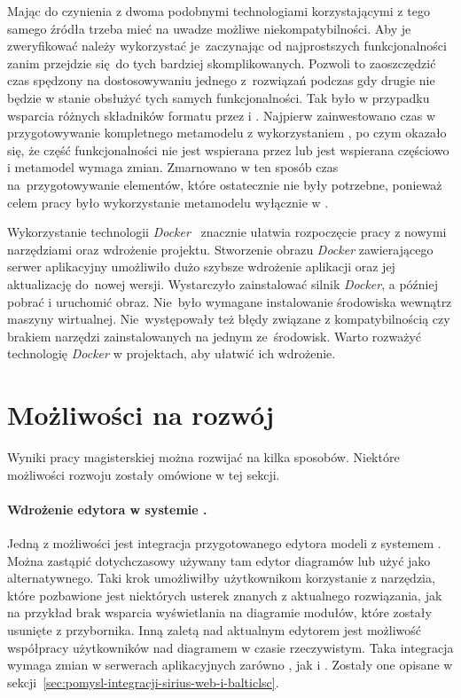 Mając do czynienia z dwoma podobnymi technologiami korzystającymi z tego samego
źródła trzeba mieć na uwadze możliwe niekompatybilności. Aby je zweryfikować
należy wykorzystać je~zaczynając od najprostszych funkcjonalności zanim
przejdzie się do tych
bardziej skomplikowanych. Pozwoli to zaoszczędzić czas spędzony na
dostosowywaniu jednego z~rozwiązań podczas gdy drugie nie będzie w stanie
obsłużyć tych samych funkcjonalności. Tak było w przypadku wsparcia różnych
składników formatu \Ecore{} przez \SiriusDesktop{} i \SiriusWeb{}. Najpierw
zainwestowano czas w przygotowywanie kompletnego
metamodelu z
wykorzystaniem \SiriusDesktop{}, po czym okazało się, że część
funkcjonalności nie jest wspierana przez \SiriusWeb{} lub jest wspierana
częściowo i metamodel wymaga zmian. Zmarnowano w ten sposób czas
na~przygotowywanie elementów, które ostatecznie nie były potrzebne, ponieważ
celem
pracy było wykorzystanie metamodelu wyłącznie w \SiriusWeb{}.

Wykorzystanie technologii \emph{Docker}~\cite{wikipedia-docker} znacznie
ułatwia rozpoczęcie pracy z
nowymi narzędziami oraz wdrożenie projektu.
Stworzenie obrazu \emph{Docker} zawierającego serwer aplikacyjny \SiriusWeb{}
umożliwiło dużo szybsze wdrożenie aplikacji oraz jej aktualizację
do~nowej wersji. Wystarczyło zainstalować silnik \emph{Docker}, a później
pobrać i uruchomić obraz. Nie~było wymagane instalowanie środowiska \Java{}
wewnątrz maszyny wirtualnej. Nie~występowały też błędy związane z
kompatybilnością czy brakiem narzędzi zainstalowanych na jednym ze~środowisk.
Warto rozważyć technologię \emph{Docker} w projektach, aby ułatwić ich
wdrożenie.

\section{Możliwości na rozwój}

Wyniki pracy magisterskiej można rozwijać na kilka sposobów. Niektóre
możliwości rozwoju zostały omówione w tej sekcji.

\paragraph{Wdrożenie edytora w systemie \BalticLSC{}.}
Jedną z możliwości jest integracja przygotowanego edytora modeli z systemem
\BalticLSC{}. Można zastąpić dotychczasowy używany tam edytor diagramów lub
użyć \SiriusWeb{} jako alternatywnego. Taki krok umożliwiłby użytkownikom
\BalticLSC{} korzystanie z narzędzia, które pozbawione jest niektórych
usterek znanych z aktualnego rozwiązania, jak na przykład brak wsparcia
wyświetlania na diagramie modułów, które zostały usunięte z przybornika.
Inną zaletą \SiriusWeb{} nad aktualnym edytorem jest możliwość współpracy
użytkowników nad diagramem w czasie rzeczywistym. Taka integracja wymaga zmian
w serwerach aplikacyjnych zarówno \SiriusWeb{}, jak i \BalticLSC{}.
Zostały one opisane w
sekcji~\ref{sec:pomysl-integracji-sirius-web-i-balticlsc}.

